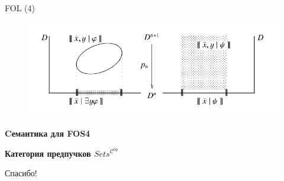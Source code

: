 \documentclass{beamer}
\begin{document}
\begin{frame}{FOL (4)}
\begin{center}
	\begin{figure}[H]
		\includegraphics[scale=0.45]{fol.png} 
	\end{figure}
\end{center}
\end{frame}



\begin{frame}{}
\begin{center}
	\textbf{Cемантика для FOS4}
\end{center}
\end{frame}




\begin{frame}{}
\begin{center}
	\textbf{Категория предпучков $Sets^{\mathcal{C}^{op}}$}
\end{center}
\end{frame}



\begin{frame}{}
    \thispagestyle{empty}
    \begin{center}
        {\large Спасибо!}
    \end{center}
\end{frame}


\end{document}
